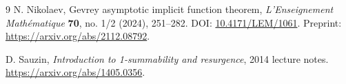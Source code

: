 \documentclass[11pt,a4paper]{article}
\numberwithin{equation}{section}
\theoremstyle{definition}
\theoremstyle{remark}
\begin{document}
\begin{thebibliography}{9}
N. Nikolaev,
Gevrey asymptotic implicit function theorem,
\emph{L'Enseignement Math\'ematique} \textbf{70}, no. 1/2 (2024), 251--282.
\newblock DOI: \href{https://doi.org/10.4171/LEM/1061}{10.4171/LEM/1061}.
\newblock Preprint: \url{https://arxiv.org/abs/2112.08792}.

D. Sauzin,
\emph{Introduction to 1-summability and resurgence},
2014 lecture notes.
\newblock \url{https://arxiv.org/abs/1405.0356}.

\end{thebibliography}
\end{document}
